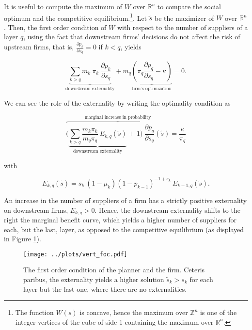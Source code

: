 \documentclass[american, abstract=on]{scrartcl}
\renewcommand{\Re}{\mathbb{R}}
\begin{document}
It is useful to compute the maximum of $W$ over $\Re^n$ to compare the social optimum and the competitive equilibrium.\footnote{The function $W(s)$ is concave, hence the maximum over $\mathbb{Z}^n$ is one of the integer vertices of the cube of side 1 containing the maximum over $\Re^n$.}. Let $\tilde{s}$ be the maximizer of $W$ over $\Re^n$. Then, the first order condition of $W$ with respect to the number of suppliers of a layer $q$, using the fact that downstream firms' decisions do not affect the risk of upstream firms, that is, $\frac{\partial p_k}{\partial s_q} = 0$ if $k < q$, yields

\begin{equation}
  \underbrace{\sum_{k > q} m_k \ \pi_k \ \frac{\partial p_k}{\partial s_q}}_{\text{downstream externality}} + m_q  \underbrace{\left( \pi_q \frac{\partial p_q}{\partial s_q} - \kappa\right)}_{\text{firm's optimization}} = 0.
\end{equation}

We can see the role of the externality by writing the optimality condition as 

\begin{equation} \label{eq:distortion}
  \overbrace{\Bigg(\underbrace{\sum_{k > q} \frac{m_k\pi_k}{m_q\pi_q} \ E_{k, q}(\tilde{s})}_{\text{downstream externality}} + \ 1 \Bigg)\ \frac{\partial p_q}{\partial s_q}(\tilde{s})}^{\text{marginal increase in probability}} = \frac{\kappa}{\pi_q}
\end{equation}

with

\begin{equation}
  E_{k, q}(\tilde{s}) = s_k \ (1 - \mu_k) (1 - p_{k-1})^{-1 + s_k}\ E_{k - 1, q}(\tilde{s}).
\end{equation}

An increase in the number of suppliers of a firm has a strictly positive externality on downstream firms, $E_{k, q} > 0$. Hence, the downstream externality shifts to the right the marginal benefit curve, which yields a higher number of suppliers for each, but the last, layer, as opposed to the competitive equilibrium (as displayed in Figure \ref{fig:vert_foc}).


\begin{figure}[H]
  \centering
  \texttt{[image: ../plots/vert\_foc.pdf]} 
  \caption{The first order condition of the planner and the firm. Ceteris paribus, the externality yields a higher solution $\tilde{s}_k > s_k$ for each layer but the last one, where there are no externalities.}
  \label{fig:vert_foc}
\end{figure}
\end{document}
